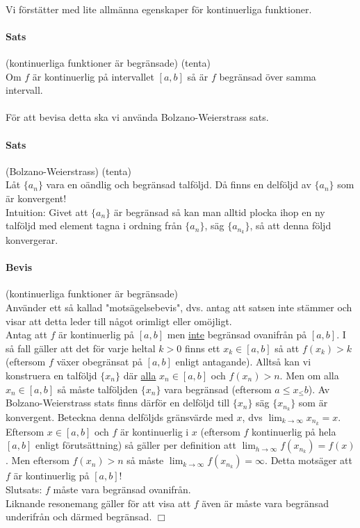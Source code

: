 ~\\
Vi förstätter med lite allmänna egenskaper för kontinuerliga funktioner.
\paragraph{Sats} (kontinuerliga funktioner är begränsade) (tenta)\\
Om $f$ är kontinuerlig på intervallet $[a,b]$ så är $f$ begränsad över samma intervall.\\\\
För att bevisa detta ska vi använda Bolzano-Weierstrass sats.
\paragraph{Sats} (Bolzano-Weierstrass) (tenta)\\
Låt $\{a_n\}$ vara en oändlig och begränsad talföljd.
Då finns en delföljd av $\{a_n\}$ som är konvergent!\\
Intuition: Givet att $\{a_n\}$ är begränsad så kan man alltid plocka
ihop en ny talföljd med element tagna i ordning från $\{a_n\}$,
säg $\{a_{n_k}\}$, så att denna följd konvergerar.

\paragraph{Bevis} (kontinuerliga funktioner är begränsade)\\
Använder ett så kallad "motsägelsebevis", dvs. antag att satsen inte stämmer och visar att detta leder till något orimligt eller omöjligt.\\
Antag att $f$ är kontinuerlig på $[a,b]$ men \underline{inte} begränsad ovanifrån på $[a,b]$.
I så fall gäller att det för varje heltal $k>0$ finns ett $x_k\in[a,b]$ så att $f(x_k)>k$ (eftersom $f$ växer obegränsat på $[a,b]$ enligt antagande).
Alltså kan vi konstruera en talföljd $\{x_n\}$ där \underline{alla} $x_n\in[a,b]$ och $f(x_n)>n$.
Men om alla $x_n\in[a,b]$ så måste talföljden $\{x_n\}$ vara begränsad (eftersom $a\leq x_ \leq b$).
Av Bolzano-Weierstrass stats finns därför en delföljd till $\{x_n\}$ säg $\{x_{n_k}\}$ som är konvergent.
Beteckna denna delföljds gränsvärde med $x$, dvs $\lim_{k\to \infty}x_{n_k}=x$.
Eftersom $x\in[a,b]$ och $f$ är kontinuerlig i $x$ (eftersom $f$ kontinuerlig på hela $[a,b]$ enligt förutsättning) så gäller per definition att $\lim_{h\to \infty}f(x_{n_k})=f(x)$.
Men eftersom $f(x_n)>n$ så måste $\lim_{k\to\infty}f(x_{n_k})=\infty$.
Detta motsäger att $f$ är kontinuerlig på $[a,b]$!\\
Slutsats: $f$ måste vara begränsad ovanifrån.\\
Liknande resonemang gäller för att visa att $f$ även är måste vara begränsad underifrån och därmed begränsad. $\Box$

